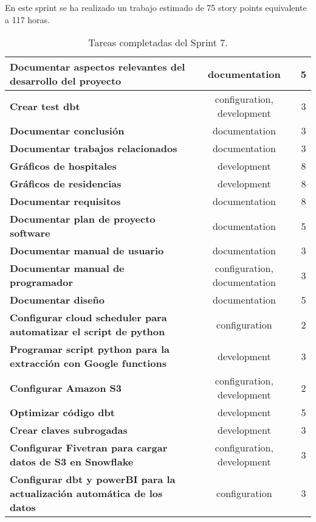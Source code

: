 En este sprint se ha realizado un trabajo estimado de 75 story points equivalente a 117 horas.
\begin{table}[ht!]
    \centering
    \resizebox{15cm}{!} {
    \begin{tabular}{|l|c|c|}
    \hline
   \textbf{Documentar aspectos relevantes del desarrollo del proyecto}       &documentation      &5 \\ \hline 
    \textbf{Crear test dbt}         &{configuration, development}     &3 \\ \hline
    \textbf{Documentar conclusión}         &{documentation}      &3 \\ \hline 
    \textbf{Documentar trabajos relacionados}         &{documentation}     &3 \\ \hline 
    \textbf{Gráficos de hospitales}         &{development}     &8 \\ \hline 
    \textbf{Gráficos de residencias}         &{development}      &8 \\ \hline 
    \textbf{Documentar requisitos}         &{documentation}      &8 \\ \hline 
    \textbf{Documentar plan de proyecto software}         &{documentation}      &5 \\ \hline 
    \textbf{Documentar manual de usuario}         &{documentation}      &3 \\ \hline 
    \textbf{Documentar manual de programador}         &{configuration, documentation}      &3 \\ \hline 
    \textbf{Documentar diseño}         &{documentation}      &5 \\ \hline 
    \textbf{Configurar cloud scheduler para automatizar el script de python}        &{configuration}      &2 \\ \hline
    \textbf{Programar script python para la extracción con Google functions}        &{development}      &3 \\ \hline 
    \textbf{Configurar Amazon S3}         &{configuration, development}      &2 \\ \hline 
    \textbf{Optimizar código dbt}         &{development}      &5 \\ \hline 
    \textbf{Crear claves subrogadas}         &{development}      &3 \\ \hline 
    \textbf{Configurar Fivetran para cargar datos de S3 en Snowflake}         &{configuration, development}      &3 \\ \hline 
     \textbf{Configurar dbt y powerBI para la actualización automática de los datos}        &{configuration}      &3 \\ \hline 
    \end{tabular}}
    \caption{Tareas completadas del Sprint 7.}
    \label{tab:my_label}
\end{table}



